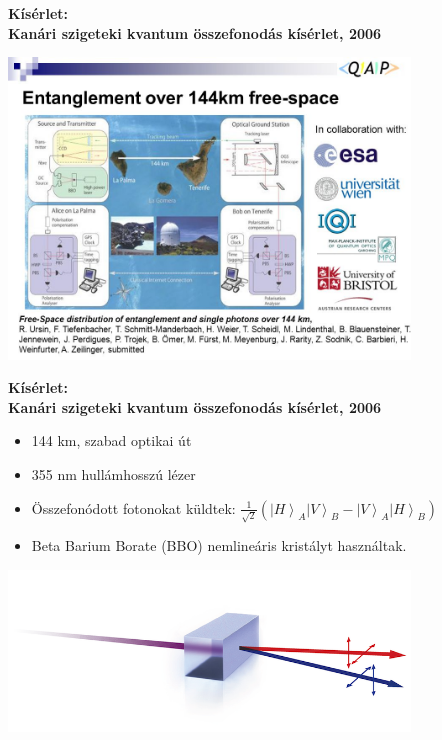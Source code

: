 \documentclass{beamer}
\begin{document}
    \begin{frame}

        \center

        \textbf{Kísérlet:\\
            Kanári szigeteki kvantum összefonodás kísérlet, 2006}

        \includegraphics[width=0.8\textwidth]{canary_entanglement.jpg}

    \end{frame}

    \begin{frame}

        \center

        \textbf{Kísérlet:\\
            Kanári szigeteki kvantum összefonodás kísérlet, 2006}

        \begin{itemize}
            \item 144 km, szabad optikai út
            \item 355 nm hullámhosszú lézer
            \item Összefonódott fotonokat küldtek:
                $\frac{1}{\sqrt{2}}\left(\left| H \right\rangle_A \left| V \right\rangle_B - \left| V \right\rangle_A \left| H \right\rangle_B \right)$
            \item Beta Barium Borate (BBO) nemlineáris kristályt használtak.
        \end{itemize}

        \includegraphics[width=0.8\textwidth]{bbo.png}

    \end{frame}
\end{document}
